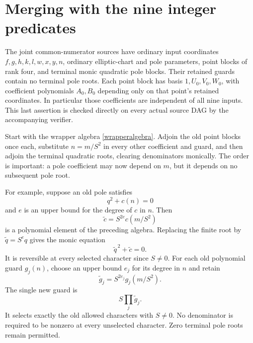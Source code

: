 \documentclass[11pt]{article}
\begin{document}
\section{Merging with the nine integer predicates}

The joint common-numerator sources have ordinary input coordinates
\(f,g,h,k,l,w,x,y,n\), ordinary elliptic-chart and pole parameters,
point blocks of rank four, and terminal monic quadratic pole blocks.
Their retained guards contain no terminal pole roots.  Each point
block has basis \(1,U_0,V_0,W_0\), with coefficient polynomials
\(A_0,B_0\) depending only on that point's retained coordinates.
In particular those coefficients are independent of all nine inputs.
This last assertion is checked directly on every actual source DAG
by the accompanying verifier.

Start with the wrapper algebra \eqref{wrapperalgebra}.  Adjoin the old
point blocks once each, substitute \(n=m/S^2\) in every other coefficient
and guard, and then adjoin the terminal quadratic roots, clearing
denominators monically.  The order is important: a pole coefficient
may now depend on \(m\), but it depends on no subsequent pole root.

For example, suppose an old pole satisfies
\[
                              q^2+c(n)=0
\]
and \(e\) is an upper bound for the degree of \(c\) in \(n\).
Then
\[
                       \widetilde c=S^{2e}c(m/S^2)
\]
is a polynomial element of the preceding algebra.  Replacing the finite
root by \(\widetilde q=S^e q\) gives the monic equation
\[
                           \widetilde q^{\,2}+\widetilde c=0.
\]
It is reversible at every selected character since \(S\ne0\).
For each old polynomial guard \(g_j(n)\), choose an upper bound \(e_j\)
for its degree in \(n\) and retain
\[
                    \widetilde g_j=S^{2e_j}g_j(m/S^2).
\]
The single new guard is
\[
                                  S\prod_j\widetilde g_j.
\]
It selects exactly the old allowed characters with \(S\ne0\).
No denominator is required to be nonzero at every unselected character.
Zero terminal pole roots remain permitted.
\end{document}
